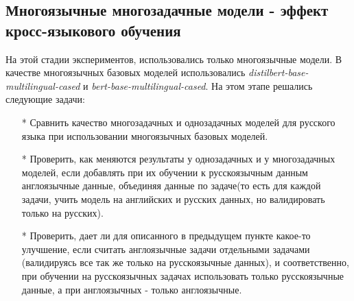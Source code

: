 \subsection{Многоязычные многозадачные модели - эффект кросс-языкового обучения}

На этой стадии экспериментов, использовались только многоязычные модели. В качестве многоязычных базовых моделей использовались \textit{distilbert-base-multilingual-cased} и \textit{bert-base-multilingual-cased}. На этом этапе решались следующие задачи:

 \begin{itemize}
\item[*] Сравнить качество многозадачных и однозадачных моделей для русского языка при использовании многоязычных базовых моделей. 
\item[*] Проверить, как меняются результаты у однозадачных и у многозадачных моделей, если добавлять при их обучении к русскоязычным данным англоязычные данные, объединяя данные по задаче(то есть для каждой задачи, учить модель на английских и русских данных, но валидировать только на русских). 
\item[*] Проверить, дает ли для описанного в предыдущем пункте какое-то улучшение, если считать англоязычные задачи отдельными задачами (валидируясь все так же только на русскоязычные данных), и соответственно, при обучении на русскоязычных задачах использовать только русскоязычные данные, а при англоязычных - только англоязычные. 
\end{itemize} 

